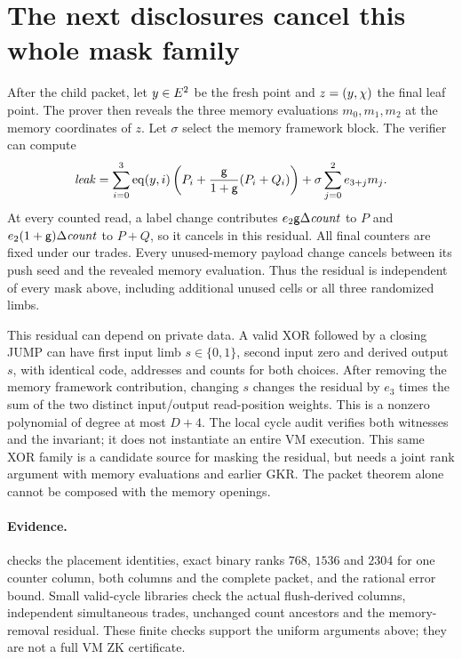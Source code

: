 \documentclass[11pt]{article}
\begin{document}
\section{The next disclosures cancel this whole mask family}

After the child packet, let $y\in E^2$ be the fresh point and $z=(y,\chi)$ the final leaf point. The prover then reveals the three memory evaluations $m_0,m_1,m_2$ at the memory coordinates of $z$. Let $\sigma$ select the memory framework block. The verifier can compute
\[
 \mathit{leak}=\sum_{i=0}^3\operatorname{eq}(y,i)
       \left(P_i+\frac{\mathsf{g}}{1+\mathsf{g}}(P_i+Q_i)\right)
       +\sigma\sum_{j=0}^2e_{3+j}m_j.
\]
At every counted read, a label change contributes $e_2\mathsf{g}\Delta\mathit{count}$ to $P$ and $e_2(1+\mathsf{g})\Delta\mathit{count}$ to $P+Q$, so it cancels in this residual. All final counters are fixed under our trades. Every unused-memory payload change cancels between its push seed and the revealed memory evaluation. Thus the residual is independent of every mask above, including additional unused cells or all three randomized limbs.

This residual can depend on private data. A valid XOR followed by a closing JUMP can have first input limb $s\in\{0,1\}$, second input zero and derived output $s$, with identical code, addresses and counts for both choices. After removing the memory framework contribution, changing $s$ changes the residual by $e_3$ times the sum of the two distinct input/output read-position weights. This is a nonzero polynomial of degree at most $D+4$. The local cycle audit verifies both witnesses and the invariant; it does not instantiate an entire VM execution. This same XOR family is a candidate source for masking the residual, but needs a joint rank argument with memory evaluations and earlier GKR. The packet theorem alone cannot be composed with the memory openings.

\paragraph{Evidence.}  checks the placement identities, exact binary ranks $768$, $1536$ and $2304$ for one counter column, both columns and the complete packet, and the rational error bound. Small valid-cycle libraries check the actual flush-derived columns, independent simultaneous trades, unchanged count ancestors and the memory-removal residual. These finite checks support the uniform arguments above; they are not a full VM ZK certificate.
\end{document}
